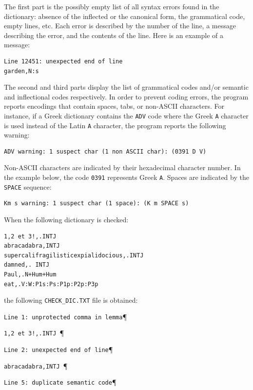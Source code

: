 \bigskip
\noindent The first part is the possibly empty list of all syntax errors found in
the dictionary: absence of the inflected or the canonical form, the grammatical
code, empty lines, etc. Each error is described by the number of the line, a
message describing the error, and the contents of the line. Here is an example
of a message:

\begin{verbatim}
Line 12451: unexpected end of line
garden,N:s
\end{verbatim}

\bigskip
\noindent The second and third parts display the list of grammatical codes and/or semantic
and inflectional codes respectively. In order to prevent coding errors, the
program reports encodings that contain spaces, tabs, or non-ASCII characters. For
instance, if a Greek dictionary contains the \verb+ADV+ code where the Greek
\verb+A+ character is used instead of the Latin \verb+A+ character, the program
reports the following warning:

\begin{verbatim}
ADV warning: 1 suspect char (1 non ASCII char): (0391 D V)
\end{verbatim}

\bigskip
\noindent Non-ASCII characters are indicated by their hexadecimal character number. In the
example below, the code \verb+0391+ represents Greek \verb+A+. Spaces are
indicated by the \verb+SPACE+ sequence:

\begin{verbatim}
Km s warning: 1 suspect char (1 space): (K m SPACE s)
\end{verbatim}

\bigskip
\noindent When the following dictionary is checked:

\begin{verbatim}
1,2 et 3!,.INTJ 
abracadabra,INTJ 
supercalifragilisticexpialidocious,.INTJ
damned,. INTJ
Paul,.N+Hum+Hum
eat,.V:W:P1s:Ps:P1p:P2p:P3p
\end{verbatim}

\bigskip
\noindent the following \verb+CHECK_DIC.TXT+ file is obtained:

\bigskip
\verb$Line 1: unprotected comma in lemma$\P

\verb$1,2 et 3!,.INTJ $\P

\verb$Line 2: unexpected end of line$\P

\verb$abracadabra,INTJ $\P

\verb$Line 5: duplicate semantic code$\P

